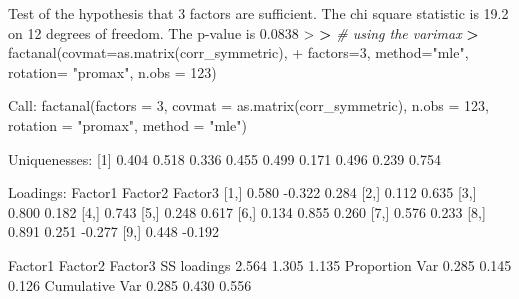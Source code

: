 \documentclass[
]{article}
\newenvironment{Shaded}{\begin{snugshade}}{\end{snugshade}}
\newcommand{\AttributeTok}[1]{\textcolor[rgb]{0.77,0.63,0.00}{#1}}
\newcommand{\CommentTok}[1]{\textcolor[rgb]{0.56,0.35,0.01}{\textit{#1}}}
\newcommand{\DecValTok}[1]{\textcolor[rgb]{0.00,0.00,0.81}{#1}}
\newcommand{\ErrorTok}[1]{\textcolor[rgb]{0.64,0.00,0.00}{\textbf{#1}}}
\newcommand{\FloatTok}[1]{\textcolor[rgb]{0.00,0.00,0.81}{#1}}
\newcommand{\FunctionTok}[1]{\textcolor[rgb]{0.00,0.00,0.00}{#1}}
\newcommand{\NormalTok}[1]{#1}
\newcommand{\SpecialCharTok}[1]{\textcolor[rgb]{0.00,0.00,0.00}{#1}}
\newcommand{\StringTok}[1]{\textcolor[rgb]{0.31,0.60,0.02}{#1}}
\begin{document}
\begin{Shaded}
\begin{Highlighting}[]
\NormalTok{Test of the hypothesis that }\DecValTok{3}\NormalTok{ factors are sufficient.}
\NormalTok{The chi square statistic is }\FloatTok{19.2}\NormalTok{ on }\DecValTok{12}\NormalTok{ degrees of freedom.}
\NormalTok{The p}\SpecialCharTok{{-}}\NormalTok{value is }\FloatTok{0.0838} 
\SpecialCharTok{\textgreater{}} 
\ErrorTok{\textgreater{}} \CommentTok{\# using the varimax}
\ErrorTok{\textgreater{}} \FunctionTok{factanal}\NormalTok{(}\AttributeTok{covmat=}\FunctionTok{as.matrix}\NormalTok{(corr\_symmetric), }
\SpecialCharTok{+}            \AttributeTok{factors=}\DecValTok{3}\NormalTok{, }\AttributeTok{method=}\StringTok{"mle"}\NormalTok{, }\AttributeTok{rotation=} \StringTok{"promax"}\NormalTok{, }\AttributeTok{n.obs =} \DecValTok{123}\NormalTok{)}

\NormalTok{Call}\SpecialCharTok{:}
\FunctionTok{factanal}\NormalTok{(}\AttributeTok{factors =} \DecValTok{3}\NormalTok{, }\AttributeTok{covmat =} \FunctionTok{as.matrix}\NormalTok{(corr\_symmetric), }\AttributeTok{n.obs =} \DecValTok{123}\NormalTok{,     }\AttributeTok{rotation =} \StringTok{"promax"}\NormalTok{, }\AttributeTok{method =} \StringTok{"mle"}\NormalTok{)}

\NormalTok{Uniquenesses}\SpecialCharTok{:}
\NormalTok{[}\DecValTok{1}\NormalTok{] }\FloatTok{0.404} \FloatTok{0.518} \FloatTok{0.336} \FloatTok{0.455} \FloatTok{0.499} \FloatTok{0.171} \FloatTok{0.496} \FloatTok{0.239} \FloatTok{0.754}

\NormalTok{Loadings}\SpecialCharTok{:}
\NormalTok{      Factor1 Factor2 Factor3}
\NormalTok{ [}\DecValTok{1}\NormalTok{,]  }\FloatTok{0.580}  \SpecialCharTok{{-}}\FloatTok{0.322}   \FloatTok{0.284} 
\NormalTok{ [}\DecValTok{2}\NormalTok{,]          }\FloatTok{0.112}   \FloatTok{0.635} 
\NormalTok{ [}\DecValTok{3}\NormalTok{,]  }\FloatTok{0.800}           \FloatTok{0.182} 
\NormalTok{ [}\DecValTok{4}\NormalTok{,]  }\FloatTok{0.743}                 
\NormalTok{ [}\DecValTok{5}\NormalTok{,]          }\FloatTok{0.248}   \FloatTok{0.617} 
\NormalTok{ [}\DecValTok{6}\NormalTok{,]  }\FloatTok{0.134}   \FloatTok{0.855}   \FloatTok{0.260} 
\NormalTok{ [}\DecValTok{7}\NormalTok{,]          }\FloatTok{0.576}   \FloatTok{0.233} 
\NormalTok{ [}\DecValTok{8}\NormalTok{,]  }\FloatTok{0.891}   \FloatTok{0.251}  \SpecialCharTok{{-}}\FloatTok{0.277} 
\NormalTok{ [}\DecValTok{9}\NormalTok{,]  }\FloatTok{0.448}          \SpecialCharTok{{-}}\FloatTok{0.192} 

\NormalTok{               Factor1 Factor2 Factor3}
\NormalTok{SS loadings      }\FloatTok{2.564}   \FloatTok{1.305}   \FloatTok{1.135}
\NormalTok{Proportion Var   }\FloatTok{0.285}   \FloatTok{0.145}   \FloatTok{0.126}
\NormalTok{Cumulative Var   }\FloatTok{0.285}   \FloatTok{0.430}   \FloatTok{0.556}


\end{Highlighting}
\end{Shaded}
\end{document}

